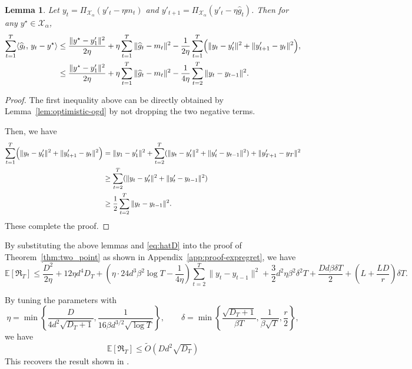 \documentclass[journal,onecolumn]{IEEEtran}
\theoremstyle{plain}
\newtheorem{lemma}[theorem]{Lemma}
\theoremstyle{definition}
\theoremstyle{remark}
\newcommand{\regret}{\mathfrak{R}}
\begin{document}
{\begin{lemma}
Let $y_t=\Pi_{\mathcal X_\alpha}(y'_t-\eta m_t)$ and
$y'_{t+1}=\Pi_{\mathcal X_\alpha}(y'_t-\eta \widehat g_t)$.
Then for any $y^\star\in\mathcal X_\alpha$,
\begin{align*}
\sum_{t=1}^T \langle \widehat g_t,\, y_t-y^\star\rangle &\le
\frac{\|y^\star-y'_1\|^2}{2\eta}
+\eta\sum_{t=1}^T \|\widehat g_t-m_t\|^2-\frac{1}{2\eta}\sum_{t=1}^T \Bigl(\|y_t-y'_t\|^2+\|y'_{t+1}-y_t\|^2\Bigr),\\
&\leq \frac{\|y^\star-y'_1\|^2}{2\eta}
+\eta\sum_{t=1}^T \|\widehat g_t-m_t\|^2-\frac{1}{4\eta}\sum_{t=2}^{T}\|y_t-y_{t-1}\|^2.
\end{align*} 
\end{lemma}

\begin{proof}
    The first inequality above can be directly obtained by Lemma~\ref{lem:optimistic-ogd} by not dropping the two negative terms.

    Then, we have
    \begin{align*}
        \sum_{t=1}^T \Bigl(\|y_t-y'_t\|^2+\|y'_{t+1}-y_t\|^2\Bigr)&=\|y_1-y'_1\|^2+\sum_{t=2}^T(\|y_t-y'_t\|^2+\|y'_{t}-y_{t-1}\|^2)+\|y'_{T+1}-y_{T}\|^2\\
        &\geq \sum_{t=2}^T(\|y_t-y'_t\|^2+\|y'_{t}-y_{t-1}\|^2)\\
        &\geq \frac{1}{2}\sum_{t=2}^T \|y_t-y_{t-1}\|^2.
    \end{align*}
These complete the proof.
\end{proof}

By substituting the above lemmas and \eqref{eq:hatD} into the proof of Theorem~\ref{thm:two_point} as shown in Appendix~\ref{app:proof-expregret}, we have  
\begin{equation*}
        \mathbb{E}[\regret_{T}]\le\frac{D^{2}}{2\eta}+12\eta d^4 D_T+(\eta\cdot 24d^3\beta^2\log T-\frac{1}{4\eta})\sum_{t=2}^T \|y_t-y_{t-1}\|^2+\frac{3}{2}d^2\eta\beta^2\delta^2T +\frac{Dd\beta\delta
        T}{2}+\left(L+\frac{LD}{r}\right)\delta T. 
\end{equation*}

By tuning the parameters with
\begin{equation*}
    \eta=\min\left\{\frac{D}{4d^2\sqrt{D_T+1}},\frac{1}{16\beta d^{3/2}\sqrt{\log T}}\right\},\qquad 
    \delta=\min\left\{\frac{\sqrt{D_T+1}}{\beta T},\frac{1}{\beta\sqrt{T}},\frac{r}{2}\right\},
\end{equation*}
we have
\begin{equation*}
    \mathbb{E}[\regret_{T}]\le\widetilde{O}(Dd^2 \sqrt{D_T})
\end{equation*}
This recovers the result shown in \cite{chiang2013beating}.





}
\end{document}
